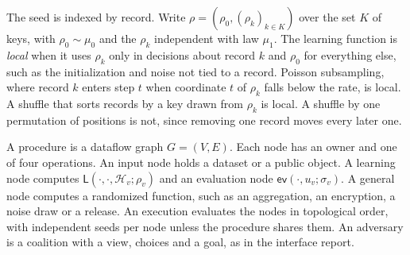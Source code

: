 \documentclass{labreport}
\newcommand{\Hc}{\mathcal{H}}
\newcommand{\Lf}{\mathsf{L}}
\newcommand{\ev}{\mathsf{ev}}
\begin{document}
The seed is indexed by record. Write $\rho=(\rho_0,(\rho_k)_{k\in K})$ over the
set $K$ of keys, with $\rho_0\sim\mu_0$ and the $\rho_k$ independent with law
$\mu_1$. The learning function is \emph{local} when it uses $\rho_k$ only in
decisions about record $k$ and $\rho_0$ for everything else, such as the
initialization and noise not tied to a record. Poisson subsampling, where record
$k$ enters step $t$ when coordinate $t$ of $\rho_k$ falls below the rate, is
local. A shuffle that sorts records by a key drawn from $\rho_k$ is local. A
shuffle by one permutation of positions is not, since removing one record moves
every later one.

A procedure is a dataflow graph $G=(V,E)$. Each node has an owner and one of
four operations. An input node holds a dataset or a public object. A learning
node computes $\Lf(\cdot,\cdot,\Hc_v;\rho_v)$ and an evaluation node
$\ev(\cdot,u_v;\sigma_v)$. A general node computes a randomized function, such as
an aggregation, an encryption, a noise draw or a release. An execution evaluates the nodes in
topological order, with independent seeds per node unless the procedure shares
them. An adversary is a coalition with a view, choices and a goal, as in the
interface report.
\end{document}
